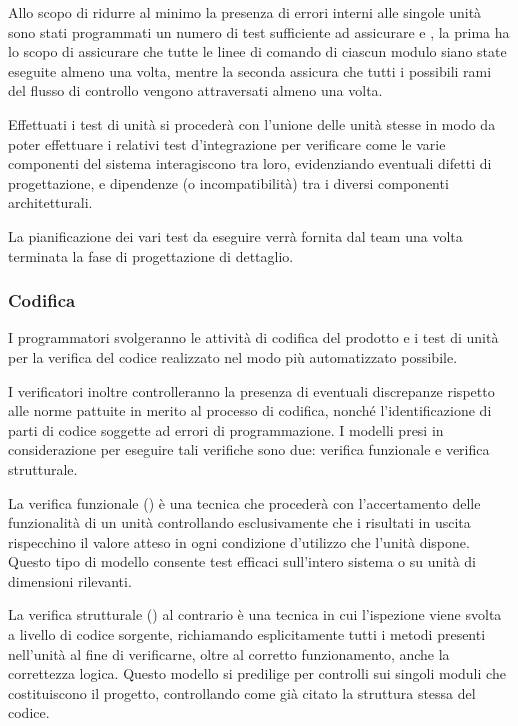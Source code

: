 Allo scopo di ridurre al minimo la presenza di errori interni alle singole unità sono stati programmati un numero di test sufficiente ad assicurare  e , la prima ha lo scopo di assicurare che tutte le linee di comando di ciascun modulo siano state eseguite almeno una volta, mentre la seconda assicura che tutti i possibili rami del flusso di controllo vengono attraversati almeno una volta.

Effettuati i test di unità si procederà con l'unione delle unità stesse in modo da poter effettuare i relativi test d'integrazione per verificare come le varie componenti del sistema interagiscono tra loro, evidenziando eventuali difetti di progettazione, e dipendenze (o incompatibilità) tra i diversi componenti architetturali.

La pianificazione dei vari test da eseguire verrà fornita dal team \team{} una volta terminata la fase di progettazione di dettaglio.

\subsubsection{Codifica}
I programmatori svolgeranno le attività di codifica del prodotto e i test di unità per la verifica del codice realizzato nel modo più automatizzato possibile.

I verificatori inoltre controlleranno la presenza di eventuali discrepanze rispetto alle norme pattuite in merito al processo di codifica, nonché l'identificazione di parti di codice soggette ad errori di programmazione.
I modelli presi in considerazione per eseguire tali verifiche sono due: verifica funzionale e verifica  strutturale.

La verifica funzionale (\underline{}) è una tecnica che procederà con l'accertamento delle funzionalità di un unità controllando esclusivamente che i risultati in uscita rispecchino il valore atteso in ogni condizione d'utilizzo che l'unità dispone. Questo tipo di modello consente test efficaci sull'intero sistema o su unità di dimensioni rilevanti.

La verifica strutturale (\underline{}) al contrario è una tecnica in cui l'ispezione viene svolta a livello di codice sorgente, richiamando esplicitamente tutti i metodi presenti nell'unità al fine di verificarne, oltre al corretto funzionamento, anche la correttezza logica. Questo modello si predilige per controlli sui singoli moduli che costituiscono il progetto, controllando come già citato la struttura stessa del codice.

